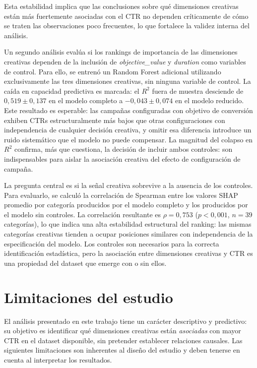 \documentclass[12pt, a4paper]{report}
\begin{document}
Esta estabilidad implica que las conclusiones sobre qué dimensiones creativas están más
fuertemente asociadas con el CTR no dependen críticamente de cómo se traten las observaciones
poco frecuentes, lo que fortalece la validez interna del análisis.

Un segundo análisis evalúa si los rankings de importancia de las dimensiones creativas
dependen de la inclusión de \textit{objective\_value} y \textit{duration} como variables
de control. Para ello, se entrenó un Random Forest adicional utilizando exclusivamente las
tres dimensiones creativas, sin ninguna variable de control. La caída en capacidad
predictiva es marcada: el $R^2$ fuera de muestra desciende de $0{,}519 \pm 0{,}137$
en el modelo completo a $-0{,}043 \pm 0{,}074$ en el modelo reducido. Este resultado
es esperable: las campañas configuradas con objetivo de conversión exhiben CTRs
estructuralmente más bajos que otras configuraciones con independencia de cualquier
decisión creativa, y omitir esa diferencia introduce un ruido sistemático que el modelo
no puede compensar. La magnitud del colapso en $R^2$ confirma, más que cuestiona, la
decisión de incluir ambos controles: son indispensables para aislar la asociación creativa
del efecto de configuración de campaña.

La pregunta central es si la señal creativa sobrevive a la ausencia de los controles.
Para evaluarlo, se calculó la correlación de Spearman entre los valores SHAP promedio
por categoría producidos por el modelo completo y los producidos por el modelo sin
controles. La correlación resultante es $\rho = 0{,}753$ ($p < 0{,}001$,
$n = 39$ categorías), lo que indica una alta estabilidad estructural del ranking: las
mismas categorías creativas tienden a ocupar posiciones similares con independencia de la
especificación del modelo. Los controles son necesarios para la correcta identificación
estadística, pero la asociación entre dimensiones creativas y CTR es una propiedad del
dataset que emerge con o sin ellos.

\section{Limitaciones del estudio}

El análisis presentado en este trabajo tiene un carácter descriptivo y predictivo:
su objetivo es identificar qué dimensiones creativas están \textit{asociadas} con
mayor CTR en el dataset disponible, sin pretender establecer relaciones causales.
Las siguientes limitaciones son inherentes al diseño del estudio y deben tenerse
en cuenta al interpretar los resultados.
\end{document}
